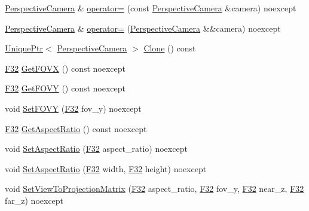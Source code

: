 \begin{DoxyCompactItemize}
\item 
\hyperlink{classmage_1_1_perspective_camera}{Perspective\+Camera} \& \hyperlink{classmage_1_1_perspective_camera_aeb226c7027f96fb225135987010cc781}{operator=} (const \hyperlink{classmage_1_1_perspective_camera}{Perspective\+Camera} \&camera) noexcept
\item 
\hyperlink{classmage_1_1_perspective_camera}{Perspective\+Camera} \& \hyperlink{classmage_1_1_perspective_camera_a2b69eb0ecc802dd0c5e3c386541a48f6}{operator=} (\hyperlink{classmage_1_1_perspective_camera}{Perspective\+Camera} \&\&camera) noexcept
\item 
\hyperlink{namespacemage_a3316d7143a973e37adf1110f2e80ca31}{Unique\+Ptr}$<$ \hyperlink{classmage_1_1_perspective_camera}{Perspective\+Camera} $>$ \hyperlink{classmage_1_1_perspective_camera_a21545965da7ef1b6f99887bb6d2bb095}{Clone} () const
\item 
\hyperlink{namespacemage_aa97e833b45f06d60a0a9c4fc22ae02c0}{F32} \hyperlink{classmage_1_1_perspective_camera_a743acc9d0f30986788a548b78ff6d0d0}{Get\+F\+O\+VX} () const noexcept
\item 
\hyperlink{namespacemage_aa97e833b45f06d60a0a9c4fc22ae02c0}{F32} \hyperlink{classmage_1_1_perspective_camera_a753f4479a5a13000864c297bc34c051f}{Get\+F\+O\+VY} () const noexcept
\item 
void \hyperlink{classmage_1_1_perspective_camera_ab3ffcf555ef03f783b5723d7a48b8014}{Set\+F\+O\+VY} (\hyperlink{namespacemage_aa97e833b45f06d60a0a9c4fc22ae02c0}{F32} fov\+\_\+y) noexcept
\item 
\hyperlink{namespacemage_aa97e833b45f06d60a0a9c4fc22ae02c0}{F32} \hyperlink{classmage_1_1_perspective_camera_a1d0b6de98514c1fdaf3e1aac4971987b}{Get\+Aspect\+Ratio} () const noexcept
\item 
void \hyperlink{classmage_1_1_perspective_camera_a60fda2d54481a0f4c04fe8a08a8d729b}{Set\+Aspect\+Ratio} (\hyperlink{namespacemage_aa97e833b45f06d60a0a9c4fc22ae02c0}{F32} aspect\+\_\+ratio) noexcept
\item 
void \hyperlink{classmage_1_1_perspective_camera_ab54d9fe7a52955201d37af521c9e9727}{Set\+Aspect\+Ratio} (\hyperlink{namespacemage_aa97e833b45f06d60a0a9c4fc22ae02c0}{F32} width, \hyperlink{namespacemage_aa97e833b45f06d60a0a9c4fc22ae02c0}{F32} height) noexcept
\item 
void \hyperlink{classmage_1_1_perspective_camera_a988390ca5bac4f3fcfb66aa7fc7effc8}{Set\+View\+To\+Projection\+Matrix} (\hyperlink{namespacemage_aa97e833b45f06d60a0a9c4fc22ae02c0}{F32} aspect\+\_\+ratio, \hyperlink{namespacemage_aa97e833b45f06d60a0a9c4fc22ae02c0}{F32} fov\+\_\+y, \hyperlink{namespacemage_aa97e833b45f06d60a0a9c4fc22ae02c0}{F32} near\+\_\+z, \hyperlink{namespacemage_aa97e833b45f06d60a0a9c4fc22ae02c0}{F32} far\+\_\+z) noexcept

\end{DoxyCompactItemize}
